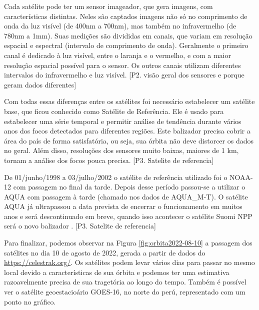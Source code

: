 \documentclass[cic,tc]{iiufrgs}
\begin{document}
Cada satélite pode ter um sensor imageador, que gera imagens, com características distintas. Neles são captados imagens não só no comprimento de onda da luz visível (de 400nm a 700nm), mas também no infravermelho (de 780nm a 1mm). Suas medições são divididas em canais, que variam em resolução espacial e espectral (intervalo de comprimento de onda). Geralmente o primeiro canal é dedicado à luz visível, entre o laranja e o vermelho, e com a maior resolução espacial possível para o sensor. Os outros canais utilizam diferentes intervalos do infravermelho e luz visível. [P2. visão geral dos sensores e porque geram dados diferentes] \par

Com todas essas diferenças entre os satélites foi necessário estabelecer um satélite base, que ficou conhecido como Satélite de Referência. Ele é usado para estabelecer uma série temporal e permitir análise de tendência durante vários anos dos focos detectados para diferentes regiões. Este balizador precisa cobrir a área do país de forma satisfatória, ou seja, sua órbita não deve distorcer os dados no geral. Além disso, resoluções dos sensores muito baixas, maiores de 1 km, tornam a análise dos focos pouca precisa. [P3. Satelite de referencia] \par

De 01/junho/1998 a 03/julho/2002 o satélite de referência utilizado foi o NOAA-12 com passagem no final da tarde. Depois desse período passou-se a utilizar o AQUA com passagem à tarde (chamado nos dados de AQUA\_M-T). O satélite AQUA já ultrapassou a data prevista de encerrar o funcionamento em muitos anos e será descontinuado em breve, quando isso acontecer o satélite Suomi NPP será o novo balizador \citep{PerguntasFrequentesINPE}. [P3. Satelite de referencia] \par

Para finalizar, podemos observar na Figura \ref{fig:orbita2022-08-10} a passagem dos satélites no dia 10 de agosto de 2022, gerada a partir de dados do \url{https://celestrak.org/}. Os satélites podem levar vários dias para passar no mesmo local devido a características de sua órbita e podemos ter uma estimativa razoavelmente precisa de sua tragetória ao longo do tempo. Também é possível ver o satélite geoestacioário GOES-16, no norte do perú, representado com um ponto no gráfico. \par
\end{document}
